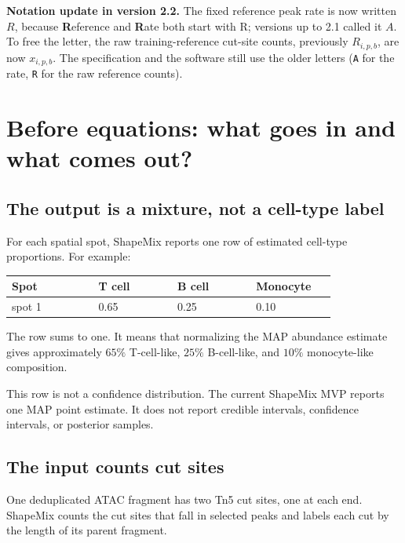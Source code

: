 \documentclass[11pt]{article}
\begin{document}
\begin{watchout}
\textbf{Notation update in version 2.2.} The fixed reference peak rate is now
written \(R\), because \textbf{R}eference and \textbf{R}ate both start with R;
versions up to 2.1 called it \(A\). To free the letter, the raw
training-reference cut-site counts, previously \(R_{i,p,b}\), are now
\(x_{i,p,b}\). The specification and the software still use the older letters
(\texttt{A} for the rate, \texttt{R} for the raw reference counts).
\end{watchout}

\section{Before equations: what goes in and what comes out?}

\subsection{The output is a mixture, not a cell-type label}

For each spatial spot, ShapeMix reports one row of estimated cell-type
proportions. For example:

\begin{center}
\begin{tabular}{L{0.22\linewidth}C{0.20\linewidth}C{0.20\linewidth}C{0.20\linewidth}}
\toprule
Spot & T cell & B cell & Monocyte \\
\midrule
spot 1 & 0.65 & 0.25 & 0.10 \\
\bottomrule
\end{tabular}
\end{center}

The row sums to one. It means that normalizing the MAP abundance estimate gives
approximately \(65\%\) T-cell-like, \(25\%\) B-cell-like, and \(10\%\)
monocyte-like composition.

\begin{watchout}
This row is not a confidence distribution. The current ShapeMix MVP reports one
MAP point estimate. It does not report credible intervals, confidence intervals,
or posterior samples.
\end{watchout}

\subsection{The input counts cut sites}

One deduplicated ATAC fragment has two Tn5 cut sites, one at each end. ShapeMix
counts the cut sites that fall in selected peaks and labels each cut by the length
of its parent fragment.
\end{document}
